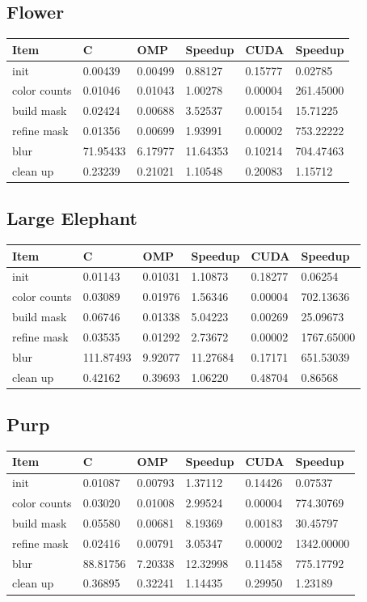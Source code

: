 \documentclass[12pt]{article}
\begin{document}
\subsection{Flower}
\begin{tabular}{l|l|l|l|l|l}
    Item & C & OMP & Speedup & CUDA & Speedup
\\  \hline
    init & 0.00439 & 0.00499 & 0.88127 & 0.15777 & 0.02785
\\  color counts & 0.01046 & 0.01043 & 1.00278 & 0.00004 & 261.45000
\\  build mask & 0.02424 & 0.00688 & 3.52537 & 0.00154 & 15.71225
\\  refine mask & 0.01356 & 0.00699 & 1.93991 & 0.00002 & 753.22222
\\  blur & 71.95433 & 6.17977 & 11.64353 & 0.10214 & 704.47463
\\  clean up & 0.23239 & 0.21021 & 1.10548 & 0.20083 & 1.15712
\end{tabular}
\subsection{Large Elephant}
\begin{tabular}{l|l|l|l|l|l}
    Item & C & OMP & Speedup & CUDA & Speedup
\\  \hline
    init & 0.01143 & 0.01031 & 1.10873 & 0.18277 & 0.06254
\\  color counts & 0.03089 & 0.01976 & 1.56346 & 0.00004 & 702.13636
\\  build mask & 0.06746 & 0.01338 & 5.04223 & 0.00269 & 25.09673
\\  refine mask & 0.03535 & 0.01292 & 2.73672 & 0.00002 & 1767.65000
\\  blur & 111.87493 & 9.92077 & 11.27684 & 0.17171 & 651.53039
\\  clean up & 0.42162 & 0.39693 & 1.06220 & 0.48704 & 0.86568
\end{tabular}
\subsection{Purp}
\begin{tabular}{l|l|l|l|l|l}
    Item & C & OMP & Speedup & CUDA & Speedup
\\  \hline
    init & 0.01087 & 0.00793 & 1.37112 & 0.14426 & 0.07537
\\  color counts & 0.03020 & 0.01008 & 2.99524 & 0.00004 & 774.30769
\\  build mask & 0.05580 & 0.00681 & 8.19369 & 0.00183 & 30.45797
\\  refine mask & 0.02416 & 0.00791 & 3.05347 & 0.00002 & 1342.00000
\\  blur & 88.81756 & 7.20338 & 12.32998 & 0.11458 & 775.17792
\\  clean up & 0.36895 & 0.32241 & 1.14435 & 0.29950 & 1.23189
\end{tabular}
\end{document}
